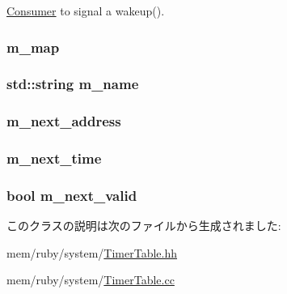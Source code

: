 \hyperlink{classConsumer}{Consumer} to signal a wakeup(). \hypertarget{classTimerTable_a81aeb6fef4ddb55c4abc1662d977def1}{
\subsubsection[{m\_\-map}]{ {\bf m\_\-map}}}
\label{classTimerTable_a81aeb6fef4ddb55c4abc1662d977def1}
\hypertarget{classTimerTable_adb41893ba19e889e56c559f25fc1a68a}{
\subsubsection[{m\_\-name}]{\setlength{\rightskip}{0pt plus 5cm}std::string {\bf m\_\-name}}}
\label{classTimerTable_adb41893ba19e889e56c559f25fc1a68a}
\hypertarget{classTimerTable_af70be644429943a989c4c0776289059f}{
\subsubsection[{m\_\-next\_\-address}]{ {\bf m\_\-next\_\-address}}}
\label{classTimerTable_af70be644429943a989c4c0776289059f}
\hypertarget{classTimerTable_ab2e7bdd220d0b6072674d78ef9974963}{
\subsubsection[{m\_\-next\_\-time}]{ {\bf m\_\-next\_\-time}}}
\label{classTimerTable_ab2e7bdd220d0b6072674d78ef9974963}
\hypertarget{classTimerTable_accdda4364ff7ccbe605fa69671ad24d1}{
\subsubsection[{m\_\-next\_\-valid}]{\setlength{\rightskip}{0pt plus 5cm}bool {\bf m\_\-next\_\-valid}}}
\label{classTimerTable_accdda4364ff7ccbe605fa69671ad24d1}


このクラスの説明は次のファイルから生成されました:\begin{DoxyCompactItemize}
\item 
mem/ruby/system/\hyperlink{TimerTable_8hh}{TimerTable.hh}\item 
mem/ruby/system/\hyperlink{TimerTable_8cc}{TimerTable.cc}\end{DoxyCompactItemize}
